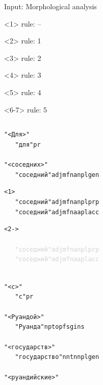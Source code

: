 \documentclass{beamer}
\begin{document}
\begin{frame}{Input: Morphological analysis}

  \begin{flushright}
    \begin{tiny}
      \begin{onlyenv}<1>
        rule: --
      \end{onlyenv}
      \begin{onlyenv}<2>
        rule: 1
      \end{onlyenv}
      \begin{onlyenv}<3>
        rule: 2
      \end{onlyenv}
      \begin{onlyenv}<4>
        rule: 3
      \end{onlyenv}
      \begin{onlyenv}<5>
        rule: 4
      \end{onlyenv}
      \begin{onlyenv}<6-7>
        rule: 5
      \end{onlyenv}
    \end{tiny}
  \end{flushright}
\vspace{-40.0pt}
\begin{columns}
  \begin{tiny}
     \begin{alltt}
"<Для>"\\
\alert<2>{~~~"для" pr}
~\\
"<соседних>"\\
\alert<2>{~~~"соседний" adj mfn an pl gen} \\
\begin{onlyenv}<1>
~~~"соседний" adj mfn an pl prp\\
~~~"соседний" adj mfn aa pl acc
\end{onlyenv}
\begin{onlyenv}<2->
\textcolor{lightgray}{
~~~"соседний" adj mfn an pl prp\\
~~~"соседний" adj mfn aa pl acc
}
\end{onlyenv}
~\\
"<с>"\\
~~~"с" pr
~\\
"<Руандой>"\\
~~~"Руанда" np top f sg ins
~\\
"<государств>"\\
~~~"государство" n nt nn pl gen
~\\
"<руандийские>"\\

\end{alltt}
\end{tiny}
\end{columns}
\end{frame}
\end{document}
